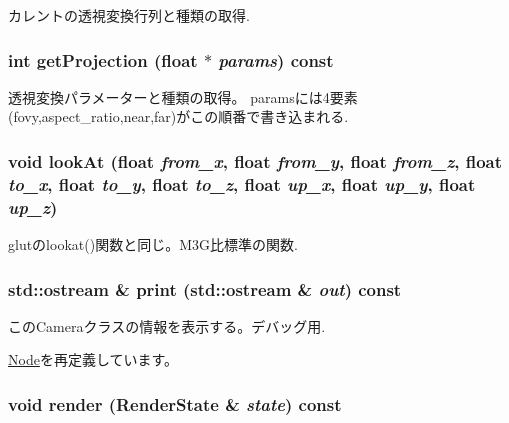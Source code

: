 カレントの透視変換行列と種類の取得. \hypertarget{classm3g_1_1Camera_a2ebe46a4e16fee86d4f547588411302}{
\subsubsection[{getProjection}]{\setlength{\rightskip}{0pt plus 5cm}int getProjection (float $\ast$ {\em params}) const}}
\label{classm3g_1_1Camera_a2ebe46a4e16fee86d4f547588411302}


透視変換パラメーターと種類の取得。 paramsには4要素(fovy,aspect\_\-ratio,near,far)がこの順番で書き込まれる. \hypertarget{classm3g_1_1Camera_0006b18ae0e27a031d533e987b9756a8}{
\subsubsection[{lookAt}]{\setlength{\rightskip}{0pt plus 5cm}void lookAt (float {\em from\_\-x}, \/  float {\em from\_\-y}, \/  float {\em from\_\-z}, \/  float {\em to\_\-x}, \/  float {\em to\_\-y}, \/  float {\em to\_\-z}, \/  float {\em up\_\-x}, \/  float {\em up\_\-y}, \/  float {\em up\_\-z})}}
\label{classm3g_1_1Camera_0006b18ae0e27a031d533e987b9756a8}


glutのlookat()関数と同じ。M3G比標準の関数. \hypertarget{classm3g_1_1Camera_6fea17fa1532df3794f8cb39cb4f911f}{
\subsubsection[{print}]{\setlength{\rightskip}{0pt plus 5cm}std::ostream \& print (std::ostream \& {\em out}) const}}
\label{classm3g_1_1Camera_6fea17fa1532df3794f8cb39cb4f911f}


このCameraクラスの情報を表示する。デバッグ用. 

\hyperlink{classm3g_1_1Node_6fea17fa1532df3794f8cb39cb4f911f}{Node}を再定義しています。\hypertarget{classm3g_1_1Camera_8babc8a79b78615da51161e94029eea9}{
\subsubsection[{render}]{\setlength{\rightskip}{0pt plus 5cm}void render ({\bf RenderState} \& {\em state}) const}}
\label{classm3g_1_1Camera_8babc8a79b78615da51161e94029eea9}


